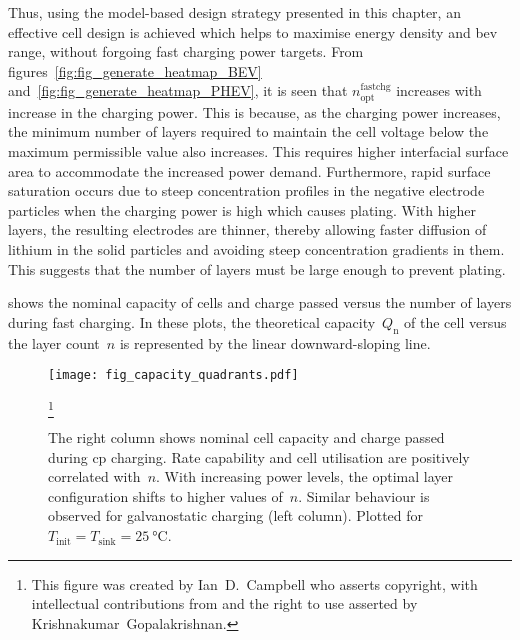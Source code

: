 Thus,   using    the   model-based    design   strategy   presented    in   this
chapter,   an   effective    cell   design   is   achieved    which   helps   to
maximise   energy   density  and   \gls{bev}   range,   without  forgoing   fast
charging   power    targets.   From   figures~\ref{fig:fig_generate_heatmap_BEV}
and~\ref{fig:fig_generate_heatmap_PHEV},       it       is       seen       that
$n^\text{fastchg}_\text{opt}$  increases with  increase in  the charging  power.
This is because,  as the charging power increases, the  minimum number of layers
required to maintain  the cell voltage below the maximum  permissible value also
increases.  This requires  higher interfacial  surface area  to accommodate  the
increased  power demand.  Furthermore, rapid  surface saturation  occurs due  to
steep  concentration  profiles in  the  negative  electrode particles  when  the
charging power is  high which causes plating. With higher  layers, the resulting
electrodes  are thinner,  thereby allowing  faster diffusion  of lithium  in the
solid  particles  and  avoiding  steep concentration  gradients  in  them.  This
suggests that the number of layers must be large enough to prevent plating.

 shows the nominal  capacity of cells and charge
passed versus  the number of  layers during fast  charging. In these  plots, the
theoretical  capacity~$Q_\text{n}$ of  the cell  versus the  layer count~$n$  is
represented by the linear downward-sloping line.

\begin{figure}[!bp]
    \begin{minipage}[t]{\textwidth}
        \centering
        \texttt{[image: fig\_capacity\_quadrants.pdf]}
        \captionsetup{labelsep=note}
        \caption[
        Nominal capacity and charge passed versus layer count for constant current  and constant power  charging
        ]
        {
            The right column shows nominal cell capacity and charge passed
            during \gls{cp} charging. Rate capability and cell utilisation are positively
            correlated with~$n$. With increasing power levels, the optimal layer configuration shifts to higher
            values of~$n$. Similar behaviour is observed for galvanostatic
            charging (left column). Plotted for~${T_\text{init} =
            T_\text{sink} = \SI{25}{\degreeCelsius}}$.
        }
        \label{fig:fig_CapacityQuadrants}
        \mpfootnotes[1]
        \footnote{This figure was created by \mbox{Ian D.\ Campbell} who asserts copyright,
            with intellectual contributions from and the right to use asserted by
        \mbox{Krishnakumar Gopalakrishnan}.}
    \end{minipage}
\end{figure}

